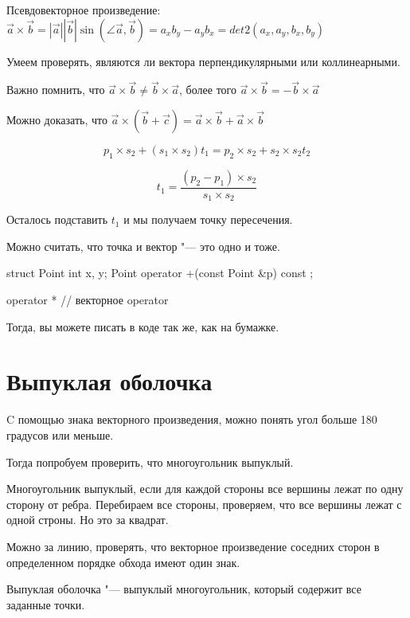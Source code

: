 \begin{Def}
Псевдовекторное произведение: $\vec{a} \times \vec{b} = |\vec{a}||\vec{b}| \sin(\angle \vec{a}, \vec{b}) = a_x b_y - a_y b_x = det2(a_x, a_y, b_x, b_y)$
\end{Def}

Умеем проверять, являются ли вектора перпендикулярными или коллинеарными. 

Важно помнить, что $\vec{a} \times \vec{b} \ne \vec{b} \times \vec{a}$, более того $\vec{a} \times \vec{b} = -\vec{b} \times \vec{a}$

Можно доказать, что $\vec{a} \times (\vec{b} + \vec{c}) = \vec{a} \times \vec{b} + \vec{a} \times \vec{b}$

$$p_1 \times s_2 + (s_1 \times s_2) t_1 = p_2 \times s_2 + s_2 \times s_2 t_2$$

$$t_1 = \frac{(p_2 - p_1) \times s_2}{s_1 \times s_2}$$

Осталось подставить $t_1$ и мы получаем точку пересечения. 

Можно считать, что точка и вектор "--- это одно и тоже.
\begin{cppcode}
struct Point {
    int x, y;
    Point operator +(const Point &p) const
};

operator * // векторное
operator %
\end{cppcode}

Тогда, вы можете писать в коде так же, как на бумажке.

\section{Выпуклая оболочка}

C помощью знака векторного произведения, можно понять угол больше 180 градусов или меньше. 

Тогда попробуем проверить, что многоугольник выпуклый. 

Многоугольник выпуклый, если для каждой стороны все вершины лежат по одну сторону от ребра. Перебираем все стороны, 
проверяем, что все вершины лежат с одной строны. Но это за квадрат.

Можно за линию, проверять, что векторное произведение соседних сторон в определенном порядке обхода имеют один знак.

\begin{Def}
Выпуклая оболочка "--- выпуклый многоугольник, который содержит все заданные точки.
\end{Def}


